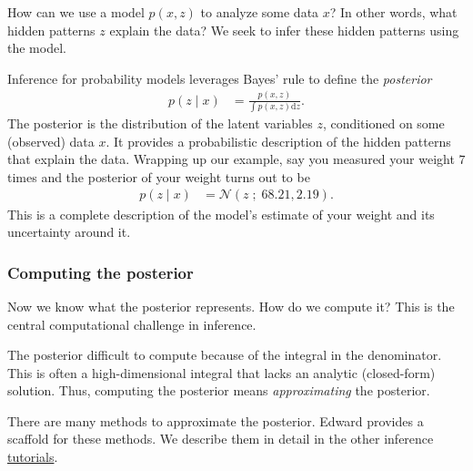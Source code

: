 How can we use a model $p(x,z)$ to analyze some data $x$? In other words,
what hidden patterns $z$ explain the data? We seek to infer these
hidden patterns using the model.

Inference for probability models leverages Bayes' rule to define the 
\emph{posterior}
\begin{align*}
  p(z \mid x)
  &=
  \frac{p(x,z)}{\int p(x,z) \text{d}z}.
\end{align*}
The posterior is the distribution of the latent variables $z$, conditioned on
some (observed) data $x$. It provides a probabilistic description of the hidden
patterns that explain the data. Wrapping up our example, say you measured your
weight $7$ times and the posterior of your weight turns out to be
\begin{align*}
  p(z \mid x) &= \mathcal{N}(z\;;\; 68.21, 2.19).
\end{align*}
This is a complete description of the model's estimate of your weight and its
uncertainty around it.


\subsubsection{Computing the posterior}

Now we know what the posterior represents. How do we compute it? This is the
central computational challenge in inference.

The posterior difficult to compute because of the integral in the denominator.
This is often a high-dimensional integral that lacks an analytic (closed-form)
solution. Thus, computing the posterior means \emph{approximating} the
posterior.

There are many methods to approximate the posterior. Edward provides a scaffold
for these methods. We describe them in detail in the other inference 
\href{tutorials.html}{tutorials}.
